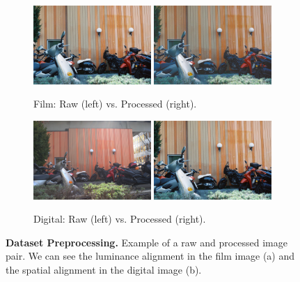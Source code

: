 \begin{figure}
    \begin{subfigure}[b]{0.49\textwidth}
      \centering
      \includegraphics[width=0.49\textwidth]{figures/raw-film.jpeg}
      \includegraphics[width=0.49\textwidth]{figures/processed-film.jpeg}
      \captionsetup{justification=centering}
      \caption{Film: Raw (left) vs. Processed (right).} 
  \end{subfigure}
  \hfill
  \begin{subfigure}[b]{0.49\textwidth}
      \centering
      \includegraphics[width=0.49\textwidth]{figures/raw-digital.jpeg}
      \includegraphics[width=0.49\textwidth]{figures/raw-film}
      \captionsetup{justification=centering}
      \caption{Digital: Raw (left) vs. Processed (right).}
  \end{subfigure}

    \caption{\textbf{Dataset Preprocessing.} Example of a raw and processed image pair. We can see the luminance alignment in the film image (a) and the spatial alignment in the digital image (b).}
    \label{fig:data-preprocessing}
\end{figure}

